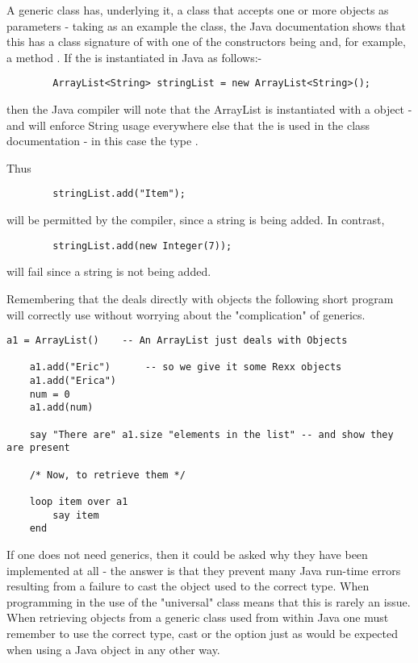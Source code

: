 {A generic class has, underlying it, a class that accepts one or more objects as parameters - taking as an example the  class, the Java documentation shows that this has a class signature of  with one of the constructors being  and, for example, a method .
 If the  is instantiated in Java as follows:-

\begin{verbatim}
		ArrayList<String> stringList = new ArrayList<String>();
\end{verbatim}

then the Java compiler will note that the ArrayList is instantiated with a  object - and will enforce String usage everywhere else that the  is used in the class documentation - in this case the type .

Thus 
\begin{verbatim}
		stringList.add("Item");
\end{verbatim}
will be permitted by the compiler, since a string is being added. In contrast, 
\begin{verbatim}
		stringList.add(new Integer(7));
\end{verbatim}
will fail since a string is not being added.

Remembering that the  deals directly with objects the following short \nr{} program will correctly use  without worrying about the "complication" of generics.

\begin{lstlisting}[label=ArrayListExample, caption=ArrayList Example]
	a1 = ArrayList()	-- An ArrayList just deals with Objects

	a1.add("Eric")		-- so we give it some Rexx objects
	a1.add("Erica")
	num = 0
	a1.add(num)

	say "There are" a1.size "elements in the list" -- and show they are present

	/* Now, to retrieve them */

	loop item over a1
		say item
	end
\end{lstlisting}

If one does not need generics, then it could be asked why they have been implemented at all - the answer is that they prevent many Java run-time errors resulting from a failure to cast the object used to the correct type. When programming in \nr{} the use of the "universal"  class means that this is rarely an issue. When retrieving objects from a generic class used from within Java one must remember to use the correct type, cast or the  option just as would be expected when using a Java object in any other way.


}
